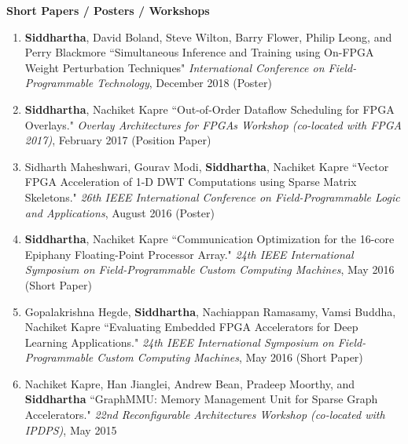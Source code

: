 \documentclass[10pt]{article}
\begin{document}
\textbf{\large Short Papers / Posters / Workshops}
\begin{enumerate}
    \item {\bf Siddhartha}, David Boland, Steve Wilton, Barry Flower, Philip Leong, and Perry Blackmore ``Simultaneous Inference and Training using On-FPGA Weight Perturbation Techniques" \emph{International Conference on Field-Programmable Technology}, December 2018 (Poster)
    \item {\bf Siddhartha}, Nachiket Kapre ``Out-of-Order Dataflow Scheduling for FPGA Overlays." \emph{Overlay Architectures for FPGAs Workshop (co-located with FPGA 2017)}, February 2017 (Position Paper)
    \item Sidharth Maheshwari, Gourav Modi, {\bf Siddhartha}, Nachiket Kapre ``Vector FPGA Acceleration of 1-D DWT Computations using Sparse Matrix Skeletons." \emph{26th IEEE International Conference on Field-Programmable Logic and Applications}, August 2016 (Poster)
    \item {\bf Siddhartha}, Nachiket Kapre ``Communication Optimization for the 16-core Epiphany Floating-Point Processor Array." \emph{24th IEEE International Symposium on Field-Programmable Custom Computing Machines}, May 2016 (Short Paper)
    \item Gopalakrishna Hegde, {\bf Siddhartha}, Nachiappan Ramasamy, Vamsi Buddha, Nachiket Kapre ``Evaluating Embedded FPGA Accelerators for Deep Learning Applications." \emph{24th IEEE International Symposium on Field-Programmable Custom Computing Machines}, May 2016 (Short Paper)
    \item Nachiket Kapre, Han Jianglei, Andrew Bean, Pradeep Moorthy, and {\bf Siddhartha} ``GraphMMU: Memory Management Unit for Sparse Graph Accelerators." \emph{22nd Reconfigurable Architectures Workshop (co-located with IPDPS)}, May 2015

\end{enumerate}
\end{document}
